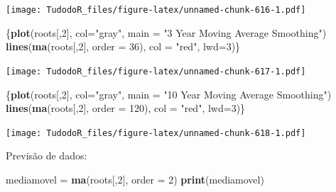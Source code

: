 \documentclass[
]{book}
\newenvironment{Shaded}{\begin{snugshade}}{\end{snugshade}}
\newcommand{\DataTypeTok}[1]{\textcolor[rgb]{0.13,0.29,0.53}{#1}}
\newcommand{\DecValTok}[1]{\textcolor[rgb]{0.00,0.00,0.81}{#1}}
\newcommand{\KeywordTok}[1]{\textcolor[rgb]{0.13,0.29,0.53}{\textbf{#1}}}
\newcommand{\NormalTok}[1]{#1}
\newcommand{\StringTok}[1]{\textcolor[rgb]{0.31,0.60,0.02}{#1}}
\begin{document}
\texttt{[image: TudodoR\_files/figure-latex/unnamed-chunk-616-1.pdf]}

\begin{Shaded}
\begin{Highlighting}[]
\NormalTok{\{}\KeywordTok{plot}\NormalTok{(roots[,}\DecValTok{2}\NormalTok{], }\DataTypeTok{col=}\StringTok{"gray"}\NormalTok{, }\DataTypeTok{main =} \StringTok{"3 Year Moving Average Smoothing"}\NormalTok{)}
\KeywordTok{lines}\NormalTok{(}\KeywordTok{ma}\NormalTok{(roots[,}\DecValTok{2}\NormalTok{], }\DataTypeTok{order =} \DecValTok{36}\NormalTok{), }\DataTypeTok{col =} \StringTok{"red"}\NormalTok{, }\DataTypeTok{lwd=}\DecValTok{3}\NormalTok{)\}}
\end{Highlighting}
\end{Shaded}

\texttt{[image: TudodoR\_files/figure-latex/unnamed-chunk-617-1.pdf]}

\begin{Shaded}
\begin{Highlighting}[]
\NormalTok{\{}\KeywordTok{plot}\NormalTok{(roots[,}\DecValTok{2}\NormalTok{], }\DataTypeTok{col=}\StringTok{"gray"}\NormalTok{, }\DataTypeTok{main =} \StringTok{"10 Year Moving Average Smoothing"}\NormalTok{)}
\KeywordTok{lines}\NormalTok{(}\KeywordTok{ma}\NormalTok{(roots[,}\DecValTok{2}\NormalTok{], }\DataTypeTok{order =} \DecValTok{120}\NormalTok{), }\DataTypeTok{col =} \StringTok{"red"}\NormalTok{, }\DataTypeTok{lwd=}\DecValTok{3}\NormalTok{)\}}
\end{Highlighting}
\end{Shaded}

\texttt{[image: TudodoR\_files/figure-latex/unnamed-chunk-618-1.pdf]}

Previsão de dados:

\begin{Shaded}
\begin{Highlighting}[]
\NormalTok{mediamovel =}\StringTok{ }\KeywordTok{ma}\NormalTok{(roots[,}\DecValTok{2}\NormalTok{], }\DataTypeTok{order =} \DecValTok{2}\NormalTok{)}
\KeywordTok{print}\NormalTok{(mediamovel)}
\end{Highlighting}
\end{Shaded}
\end{document}
